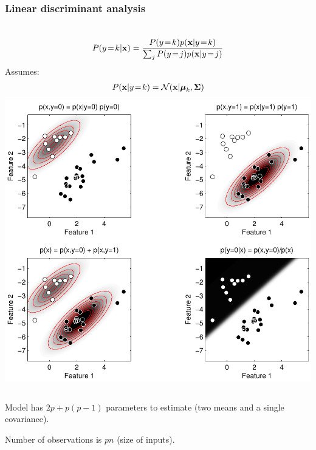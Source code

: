 \begin{frame}
\frametitle{Linear discriminant analysis}
\begin{columns}[c]
\begin{align*}
P(y\!=\!k|{\bf x}) = \frac{P(y\!=\!k) p({\bf x}|y\!=\!k)}{\sum_j P(y\!=\!j) p({\bf x}|y\!=\!j)}
\end{align*}
Assumes:
\begin{align*}
P({\bf x}|y\!=\!k) = \mathcal{N}({\bf x} | {\boldsymbol\mu}_k, \boldsymbol\Sigma)
\end{align*}
\includegraphics[width=\textwidth]{simple_fld}
\end{columns}
Model has $2p + p(p-1)$ parameters to estimate (two means and a single covariance).\par
Number of observations is $pn$ (size of inputs).
\end{frame}

